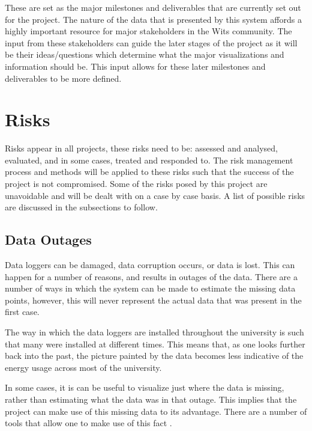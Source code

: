 \documentclass[12pt,onecolumn]{IEEEtran}
\begin{document}
These are set as the major milestones and deliverables that are currently set out for the project. The nature of the data that is presented by this system affords a highly important resource for major stakeholders in the Wits community.
The input from these stakeholders can guide the later stages of the project as it will be their ideas/questions which determine what the major visualizations and information should be.%
This input allows for these later milestones and deliverables to be more defined.


\section{Risks} \label{sec:Risks}
Risks appear in all projects, these risks need to be: assessed and analysed, evaluated, and in some cases, treated and responded to.
The risk management process and methods will be applied to these risks such that the success of the project is not compromised.
Some of the risks posed by this project are unavoidable and will be dealt with on a case by case basis.
A list of possible risks are discussed in the subsections to follow.


\subsection{Data Outages} \label{sec:DataOutages}
Data loggers can be damaged, data corruption occurs, or data is lost. This can happen for a number of reasons, and results in outages of the data.
There are a number of ways in which the system can be made to estimate the missing data points, however, this will never represent the actual data that was present in the first case.

The way in which the data loggers are installed throughout the university is such that many were installed at different times. 
This means that, as one looks further back into the past, the picture painted by the data becomes less indicative of the energy usage across most of the university. 

In some cases, it is can be useful to visualize just where the data is missing, rather than estimating what the data was in that outage.
This implies that the project can make use of this missing data to its advantage. There are a number of tools that allow one to make use of this fact \cite{missingdata1,missingdata2}.
\end{document}
